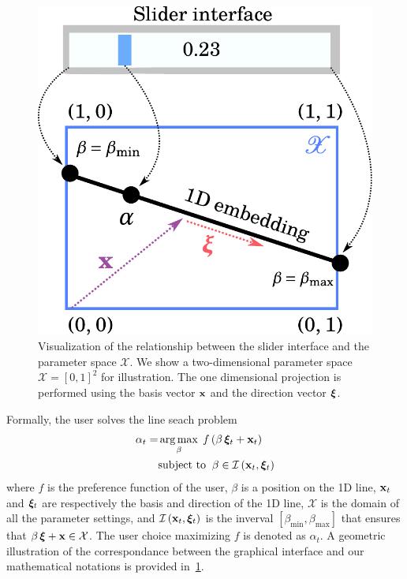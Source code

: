\begin{figure}[h]
  \centering
  \includegraphics[scale=0.35]{figures/linesearch.pdf}
  \caption{Visualization of the relationship between the slider interface and the parameter space \(\mathcal{X}\).
    We show a two-dimensional parameter space \(\mathcal{X} = {[0, 1]}^2\) for illustration.
    The one dimensional projection is performed using the basis vector \(\mathbf{x}\) and the direction vector \(\bm{\xi}\).
  }\label{fig:linesearch}
\end{figure}
%
Formally, the user solves the line seach problem
\begin{align}
 \alpha_t = &\operatorname*{arg\,max}_{ \beta }\; f\,(\beta\,\bm{\xi}_t + \mathbf{x}_t) \label{eq:line_search}\\
 &\text{subject to}\;\; \beta \in \mathcal{I}\left(\mathbf{x}_t, \bm{\xi}_t\right) 
\end{align}
{\noindent}where \(f\) is the preference function of the user, \(\beta\) is a position on the 1D line, \(\mathbf{x}_t\) and \(\bm{\xi}_t\) are respectively the basis and direction of the 1D line, \(\mathcal{X}\) is the domain of all the parameter settings, and \(\mathcal{I}\left(\mathbf{x}_t, \bm{\xi}_t\right)\) is the inverval \([\beta_{\mathrm{min}}, \beta_{\mathrm{max}}]\) that ensures that \(\beta\,\bm{\xi} + \mathbf{x}  \in \mathcal{X}\).
The user choice maximizing \(f\) is denoted as \(\alpha_t\).
A geometric illustration of the correspondance between the graphical interface and our mathematical notations is provided in~\cref{fig:linesearch}.

